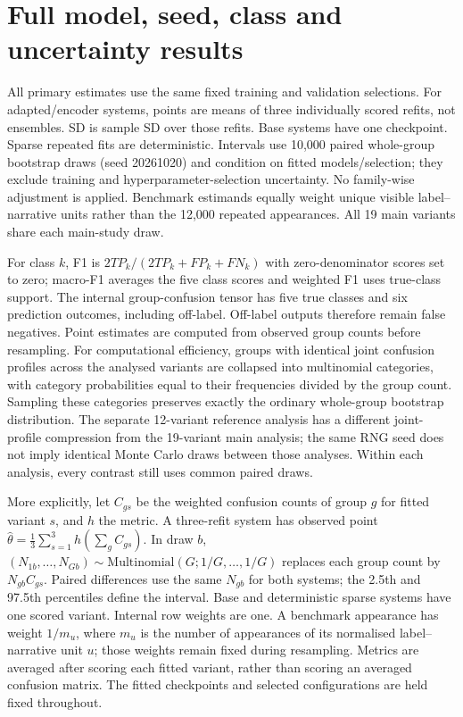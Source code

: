 \documentclass[10pt,a4paper]{article}
\begin{document}
\section{Full model, seed, class and uncertainty results}\label{sup:performance}


All primary estimates use the same fixed training and validation selections. For adapted/encoder systems, points are means of three individually scored refits, not ensembles. SD is sample SD over those refits. Base systems have one checkpoint. Sparse repeated fits are deterministic. Intervals use 10,000 paired whole-group bootstrap draws (seed 20261020) and condition on fitted models/selection; they exclude training and hyperparameter-selection uncertainty. No family-wise adjustment is applied. Benchmark estimands equally weight unique visible label--narrative units rather than the 12,000 repeated appearances. All 19 main variants share each main-study draw.

For class $k$, F1 is $2TP_k/(2TP_k+FP_k+FN_k)$ with zero-denominator scores set to zero; macro-F1 averages the five class scores and weighted F1 uses true-class support. The internal group-confusion tensor has five true classes and six prediction outcomes, including off-label. Off-label outputs therefore remain false negatives. Point estimates are computed from observed group counts before resampling. For computational efficiency, groups with identical joint confusion profiles across the analysed variants are collapsed into multinomial categories, with category probabilities equal to their frequencies divided by the group count. Sampling these categories preserves exactly the ordinary whole-group bootstrap distribution. The separate 12-variant reference analysis has a different joint-profile compression from the 19-variant main analysis; the same RNG seed does not imply identical Monte Carlo draws between those analyses. Within each analysis, every contrast still uses common paired draws.

More explicitly, let $C_{gs}$ be the weighted confusion counts of group $g$ for fitted variant $s$, and $h$ the metric. A three-refit system has observed point $\widehat\theta=\frac{1}{3}\sum_{s=1}^3 h(\sum_g C_{gs})$. In draw $b$, $(N_{1b},\ldots,N_{Gb})\sim\mathrm{Multinomial}(G;1/G,\ldots,1/G)$ replaces each group count by $N_{gb}C_{gs}$. Paired differences use the same $N_{gb}$ for both systems; the 2.5th and 97.5th percentiles define the interval. Base and deterministic sparse systems have one scored variant. Internal row weights are one. A benchmark appearance has weight $1/m_u$, where $m_u$ is the number of appearances of its normalised label--narrative unit $u$; those weights remain fixed during resampling. Metrics are averaged after scoring each fitted variant, rather than scoring an averaged confusion matrix. The fitted checkpoints and selected configurations are held fixed throughout.
\end{document}
